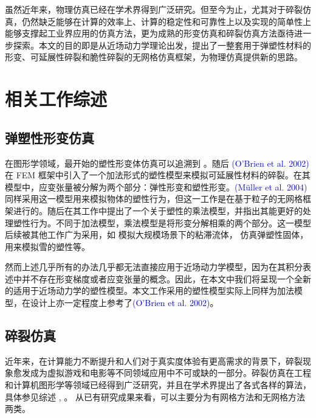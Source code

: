 虽然近年来，物理仿真已经在学术界得到广泛研究。但至今为止，尤其对于碎裂仿真，仍然缺乏能够在计算的效率上、计算的稳定性和可靠性上以及实现的简单性上能够支撑起工业界应用的仿真方法，更为成熟的形变仿真和碎裂仿真方法亟待进一步探索。本文的目的即是从近场动力学理论出发，提出了一整套用于弹塑性材料的形变、可延展性碎裂和脆性碎裂的无网格仿真框架，为物理仿真提供新的思路。

\section{相关工作综述}
\label{related_work}

\subsection{弹塑性形变仿真}

在图形学领域，最开始的塑性形变体仿真可以追溯到 。随后 \textcolor{blue}{(O'Brien et al. 2002)\parencite{OBrien2002}} 在 FEM 框架中引入了一个加法形式的塑性模型来模拟可延展性材料的碎裂。在其模型中，应变张量被分解为两个部分：弹性形变和塑性形变。\textcolor{blue}{(M\"{u}ller et al. 2004)\parencite{Muller2004}} 同样采用这一模型用来模拟物体的塑性行为，但这一工作是在基于粒子的无网格框架进行的。随后在其工作中提出了一个关于塑性的乘法模型，并指出其能更好的处理塑性行为。不同于加法模型，乘法模型是将形变分解相乘的两个部分。这一模型后续被其他工作广为采用，如 模拟大规模场景下的粘滞流体， 仿真弹塑性固体， 用来模拟雪的塑性等。

然而上述几乎所有的办法几乎都无法直接应用于近场动力学模型，因为在其积分表述中并不存在形变梯度或者应变张量的概念。因此，在本文中我们将呈现一个全新的适用于近场动力学的塑性模型。本文工作采用的塑性模型实际上同样为加法模型，在设计上亦一定程度上参考了\textcolor{blue}{(O'Brien et al. 2002)\parencite{OBrien2002}}。


\subsection{碎裂仿真}

近年来，在计算能力不断提升和人们对于真实度体验有更高需求的背景下，碎裂现象愈发成为虚拟游戏和电影等不同领域应用中不可或缺的一部分。碎裂仿真在工程和计算机图形学等领域已经得到广泛研究，并且在学术界提出了各式各样的算法，具体参见综述 , 。 从已有研究成果来看，可以主要分为有网格方法和无网格方法两类。

